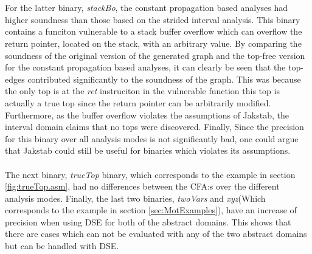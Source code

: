 \documentclass{kththesis}
\renewcommand{\it}[1]{\textit{#1}}
\begin{document}
\\ \\
For the latter binary, \it{stackBo}, the constant propagation based analyses had higher soundness than those based on the strided interval analysis. This binary contains a funciton vulnerable to a stack buffer overflow which can overflow the return pointer, located on the stack, with an arbitrary value. By comparing the soundness of the original version of the generated graph and the top-free version for the constant propagation based analyses, it can clearly be seen that the top-edges contributed significantly to the soundness of the graph. This was because the only top is at the \it{ret} instruciton in the vulnerable function this top is actually a true top since the return pointer can be arbitrarily modified. Furthermore, as the buffer overflow violates the assumptions of Jakstab, the interval domain claims that no tops were discovered. Finally, Since the precision for this binary over all analysis modes is not significantly bad, one could argue that Jakstab could still be useful for binaries which violates its assumptions.
\\ \\
The next binary, \it{trueTop} binary, which corresponds to the example in section \ref{fig:trueTop.asm}, had no differences between the CFA:s over the different analysis modes. Finally, the last two binaries, \it{twoVars} and \it{xyz}(Which corresponds to the example in section \ref{sec:MotExamples}), have an increase of precision when using DSE for both of the abstract domains. This shows that there are cases which can not be evaluated with any of the two abstract domains but can be handled with DSE.
\end{document}
